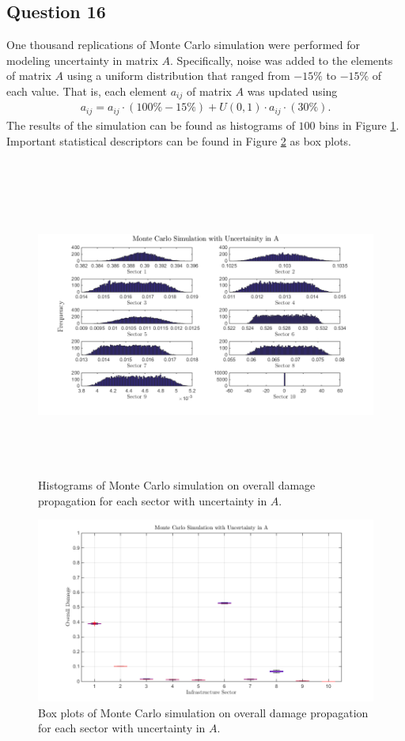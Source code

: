 \documentclass[11pt,a4paper]{article}
\begin{document}
\subsection*{Question 16}
One thousand replications of Monte Carlo simulation were performed for modeling uncertainty in matrix $A$. Specifically, noise was added to the elements of matrix $A$ using a uniform distribution that ranged from $-15\%$ to $-15\%$ of each value. That is, each element $a_{ij}$ of matrix $A$ was updated using
\begin{align}
	a_{ij} = a_{ij} \cdot (100\% - 15\%) + U(0,1) \cdot a_{ij} \cdot (30 \%).
	\label{eq: Noise}
\end{align} 
The results of the simulation can be found as histograms of $100$ bins in Figure \ref{fig: Histograms Monte Carlo A}. Important statistical descriptors can be found in Figure \ref{fig: Box Plots Monte Carlo A} as box plots. \\
\\
\begin{figure}
	\centering
	\includegraphics[width=1\textwidth, height=10cm]
    {monte_carlo_A_1000_100.png}
    \caption{Histograms of Monte Carlo simulation on overall damage propagation for each sector with uncertainty in $A$.}
    \label{fig: Histograms Monte Carlo A}
\end{figure}
\begin{figure}
	\centering
	\includegraphics[width=1\textwidth]
    {monte_carlo_A_1000_100_box_plot.png}
    \caption{Box plots of Monte Carlo simulation on overall damage propagation for each sector with uncertainty in $A$.}
    \label{fig: Box Plots Monte Carlo A}
\end{figure}
\end{document}
